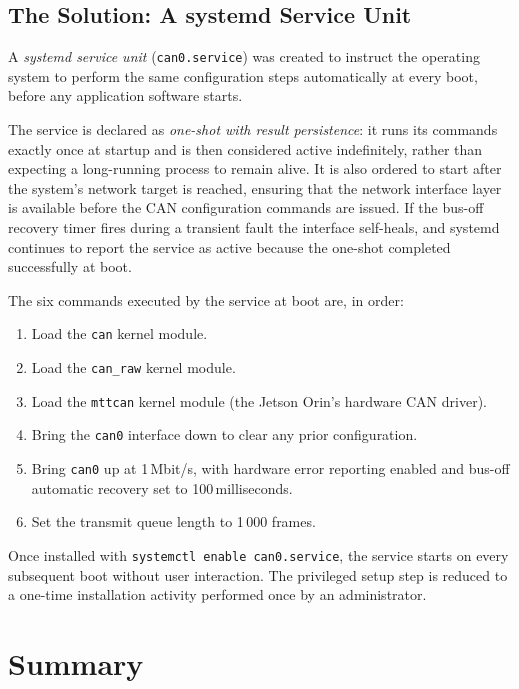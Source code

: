 \documentclass[12pt,a4paper]{article}
\begin{document}
\subsection{The Solution: A systemd Service Unit}

A \emph{systemd service unit} (\texttt{can0.service}) was created to
instruct the operating system to perform the same configuration steps
automatically at every boot, before any application software starts.

The service is declared as \emph{one-shot with result persistence}: it
runs its commands exactly once at startup and is then considered active
indefinitely, rather than expecting a long-running process to remain alive.
It is also ordered to start after the system's network target is reached,
ensuring that the network interface layer is available before the CAN
configuration commands are issued.  If the bus-off recovery timer fires
during a transient fault the interface self-heals, and systemd continues
to report the service as active because the one-shot completed
successfully at boot.

The six commands executed by the service at boot are, in order:

\begin{enumerate}
  \item Load the \texttt{can} kernel module.
  \item Load the \texttt{can\_raw} kernel module.
  \item Load the \texttt{mttcan} kernel module (the Jetson Orin's
        hardware CAN driver).
  \item Bring the \texttt{can0} interface down to clear any prior
        configuration.
  \item Bring \texttt{can0} up at 1\,Mbit/s, with hardware error
        reporting enabled and bus-off automatic recovery set to
        100\,milliseconds.
  \item Set the transmit queue length to 1\,000 frames.
\end{enumerate}

Once installed with \texttt{systemctl enable can0.service}, the service
starts on every subsequent boot without user interaction.  The privileged
setup step is reduced to a one-time installation activity performed once
by an administrator.

\section{Summary}
\label{sec:summary}
\end{document}

